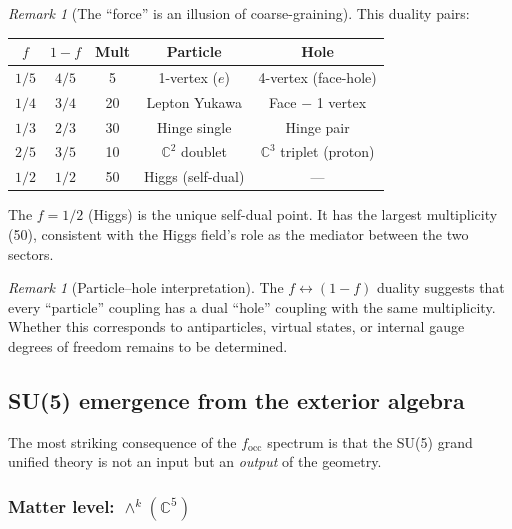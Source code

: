 \documentclass[12pt]{article}
\theoremstyle{remark}
\newtheorem{remark}[theorem]{Remark}
\theoremstyle{definition}
\newcommand{\CC}{\mathbb{C}}
\begin{document}
\begin{remark}[The ``force'' is an illusion of coarse-graining]
This duality pairs:
\begin{center}
\begin{tabular}{ccccc}
\hline
$f$ & $1-f$ & Mult & Particle & Hole \\
\hline
$1/5$ & $4/5$ & 5 & 1-vertex ($e$) & 4-vertex (face-hole) \\
$1/4$ & $3/4$ & 20 & Lepton Yukawa & Face $-$ 1 vertex \\
$1/3$ & $2/3$ & 30 & Hinge single & Hinge pair \\
$2/5$ & $3/5$ & 10 & $\CC^2$ doublet & $\CC^3$ triplet (proton) \\
$1/2$ & $1/2$ & 50 & Higgs (self-dual) & --- \\
\hline
\end{tabular}
\end{center}

The $f = 1/2$ (Higgs) is the unique self-dual point.  It has the largest multiplicity (50), consistent with the Higgs field's role as the mediator between the two sectors.

\begin{remark}[Particle--hole interpretation]
The $f \leftrightarrow (1-f)$ duality suggests that every ``particle'' coupling has a dual ``hole'' coupling with the same multiplicity.  Whether this corresponds to antiparticles, virtual states, or internal gauge degrees of freedom remains to be determined.
\end{remark}

\subsection{SU(5) emergence from the exterior algebra}
\label{sec:su5_emergence}

The most striking consequence of the $f_\mathrm{occ}$ spectrum is that the SU(5) grand unified theory is not an input but an \emph{output} of the geometry.

\subsubsection{Matter level: $\wedge^k(\CC^5)$}


\end{remark}
\end{document}
